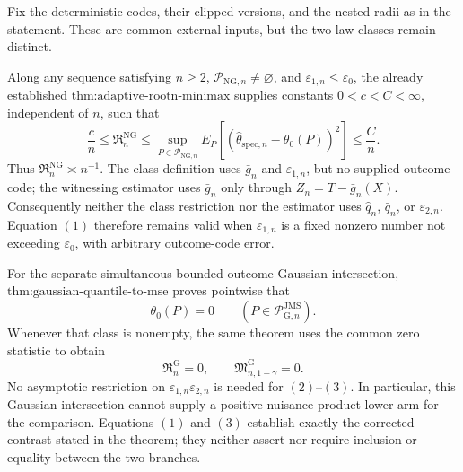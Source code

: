 Fix the deterministic codes, their clipped versions, and the nested radii as in the statement.  These are common external inputs, but the two law classes remain distinct.

Along any sequence satisfying \(n\ge2\), \(\mathcal P_{\mathrm{NG},n}\ne\varnothing\), and \(\varepsilon_{1,n}\le\varepsilon_0\), the already established \(\text{thm:adaptive-rootn-minimax}\) supplies constants \(0<c<C<\infty\), independent of \(n\), such that
\[
 \frac{c}{n}
 \le \mathfrak R_n^{\mathrm{NG}}
 \le \sup_{P\in\mathcal P_{\mathrm{NG},n}}
 E_P[(\widehat\theta_{\mathrm{spec},n}-\theta_0(P))^2]
 \le \frac{C}{n}. \tag{1}
\]
Thus \(\mathfrak R_n^{\mathrm{NG}}\asymp n^{-1}\).  The class definition uses \(\bar g_n\) and \(\varepsilon_{1,n}\), but no supplied outcome code; the witnessing estimator uses \(\bar g_n\) only through \(Z_n=T-\bar g_n(X)\).  Consequently neither the class restriction nor the estimator uses \(\widehat q_n\), \(\bar q_n\), or \(\varepsilon_{2,n}\).  Equation \((1)\) therefore remains valid when \(\varepsilon_{1,n}\) is a fixed nonzero number not exceeding \(\varepsilon_0\), with arbitrary outcome-code error.

For the separate simultaneous bounded-outcome Gaussian intersection, \(\text{thm:gaussian-quantile-to-mse}\) proves pointwise that
\[
 \theta_0(P)=0
 \qquad
 (P\in\mathcal P_{\mathrm G,n}^{\mathrm{JMS}}). \tag{2}
\]
Whenever that class is nonempty, the same theorem uses the common zero statistic to obtain
\[
 \mathfrak R_n^{\mathrm G}=0,
 \qquad
 \mathfrak M_{n,1-\gamma}^{\mathrm G}=0. \tag{3}
\]
No asymptotic restriction on \(\varepsilon_{1,n}\varepsilon_{2,n}\) is needed for \((2)\)--\((3)\).  In particular, this Gaussian intersection cannot supply a positive nuisance-product lower arm for the comparison.  Equations \((1)\) and \((3)\) establish exactly the corrected contrast stated in the theorem; they neither assert nor require inclusion or equality between the two branches.